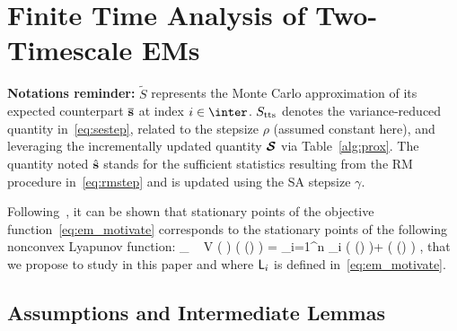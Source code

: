 \documentclass[12pt]{article}
\begin{document}



\section{Finite Time Analysis of Two-Timescale EMs} \label{sec:mainanalysis}
\textbf{Notations reminder:}
$\tilde{S}$ represents the Monte Carlo approximation of its expected counterpart $\overline{{\mathbf{s}}}$ at index $i \in \inter$.
$S_{\textrm{tts}}$ denotes the variance-reduced quantity in~\eqref{eq:sestep}, related to the stepsize $\rho$ (assumed constant here), and leveraging the incrementally updated quantity ${\bm{\mathcal{S}}}$ via Table~\ref{alg:prox}.
The quantity noted $\hat{{\mathbf{s}}}$ stands for the sufficient statistics resulting from the RM procedure in~\eqref{eq:rmstep} and is updated using the SA stepsize $\gamma$.

Following~\citet{cappe2009line}, it can be shown that stationary points of the objective function~\eqref{eq:em_motivate} corresponds to the stationary points of the following {nonconvex} Lyapunov function:
\beq\label{eq:em_sspace}
\min_{ {\bss} \in \Sset }~  V ( {\bss} ) \eqdef \overline\calL( \op(\bss) ) =   \sum_{i=1}^n  \calL _i (  \op(\bss) )+ \Pen (  \op(\bss) ) \eqs,
\eeq
that we propose to study in this paper and where ${\textsf{L}} _i$ is defined in~\eqref{eq:em_motivate}.


\subsection{Assumptions and Intermediate Lemmas}
\end{document}
